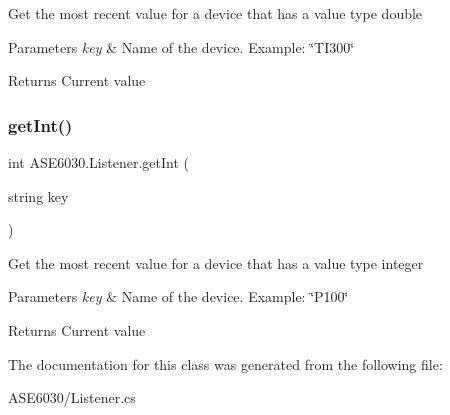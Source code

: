 Get the most recent value for a device that has a value type double 


\begin{DoxyParams}{Parameters}
{\em key} & Name of the device. Example\+: \char`\"{}\+T\+I300\char`\"{}\\
\hline
\end{DoxyParams}
\begin{DoxyReturn}{Returns}
Current value
\end{DoxyReturn}
\mbox{\label{class_a_s_e6030_1_1_listener_a7f82d12db6e97dd86f78dc2f62b23214}} 
\subsubsection{\texorpdfstring{get\+Int()}{getInt()}}
{\footnotesize\ttfamily int A\+S\+E6030.\+Listener.\+get\+Int (\begin{DoxyParamCaption}\item[{string}]{key }\end{DoxyParamCaption})\hspace{0.3cm}{\ttfamily [inline]}}



Get the most recent value for a device that has a value type integer 


\begin{DoxyParams}{Parameters}
{\em key} & Name of the device. Example\+: \char`\"{}\+P100\char`\"{}\\
\hline
\end{DoxyParams}
\begin{DoxyReturn}{Returns}
Current value
\end{DoxyReturn}


The documentation for this class was generated from the following file\+:\begin{DoxyCompactItemize}
\item 
A\+S\+E6030/Listener.\+cs\end{DoxyCompactItemize}
